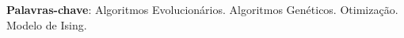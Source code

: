 \documentclass[
	12pt,				%
	openright,			%
	twoside,			%
	a4paper,			%
	english,			%
	brazil				%
	]{abntex2}
\begin{document}
\begin{resumo}
	

\vspace{\onelineskip}

\noindent 
 \textbf{Palavras-chave}: Algoritmos Evolucionários. Algoritmos Genéticos. Otimização. Modelo de Ising.
\end{resumo}
\end{document}

